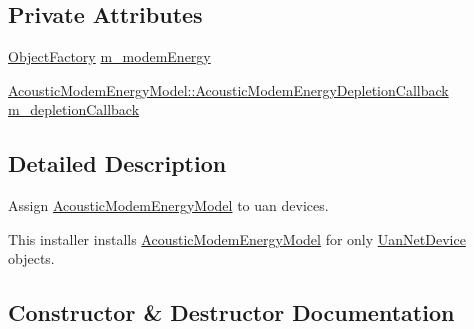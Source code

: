 \subsection*{Private Attributes}
\begin{DoxyCompactItemize}
\item 
\hyperlink{classns3_1_1ObjectFactory}{Object\+Factory} \hyperlink{classns3_1_1AcousticModemEnergyModelHelper_a1bd2876f2988dd9e4eb51013d4f553e1}{m\+\_\+modem\+Energy}
\item 
\hyperlink{classns3_1_1AcousticModemEnergyModel_a04ad0c4c5ea21dc8d221761b734c317b}{Acoustic\+Modem\+Energy\+Model\+::\+Acoustic\+Modem\+Energy\+Depletion\+Callback} \hyperlink{classns3_1_1AcousticModemEnergyModelHelper_a3b1b49f8077c22354bb5eccff83d3910}{m\+\_\+depletion\+Callback}
\end{DoxyCompactItemize}


\subsection{Detailed Description}
Assign \hyperlink{classns3_1_1AcousticModemEnergyModel}{Acoustic\+Modem\+Energy\+Model} to uan devices.

This installer installs \hyperlink{classns3_1_1AcousticModemEnergyModel}{Acoustic\+Modem\+Energy\+Model} for only \hyperlink{classns3_1_1UanNetDevice}{Uan\+Net\+Device} objects. 

\subsection{Constructor \& Destructor Documentation}
